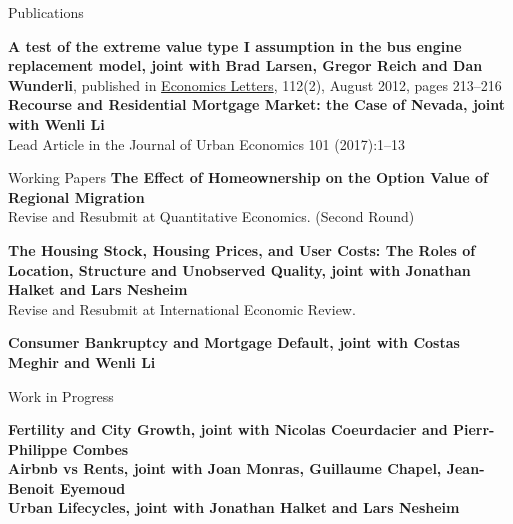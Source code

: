 \documentclass{cvjobmarket} %
\begin{document}
\newpage


\begin{rSection}{Publications}

{\textbf{A test of the extreme value type I assumption in the bus engine replacement model, joint with Brad Larsen, Gregor Reich and Dan Wunderli}, published in \href{http://www.sciencedirect.com/science/article/pii/S0165176512000870}{Economics Letters}, 112(2), August 2012, pages 213--216}\\ 


{\textbf{Recourse and Residential Mortgage Market: the Case of Nevada, joint with Wenli Li}} \\
{Lead Article in the Journal of Urban Economics 101 (2017):1–13}

\end{rSection}

\begin{rSection}{Working Papers}
{\textbf{The Effect of Homeownership on the Option Value of Regional Migration}}\\
{Revise and Resubmit at Quantitative Economics. (Second Round)}

{\textbf{The Housing Stock, Housing Prices, and User Costs: The Roles of Location, Structure and Unobserved Quality, joint with Jonathan Halket and Lars Nesheim}} \\
{Revise and Resubmit at International Economic Review.}

{\textbf{Consumer Bankruptcy and Mortgage Default, joint with Costas Meghir and Wenli Li}} \\



\end{rSection}
\begin{rSection}{Work in Progress}

{\textbf{Fertility and City Growth, joint with Nicolas Coeurdacier and Pierr-Philippe Combes}} \\

{\textbf{Airbnb vs Rents, joint with Joan Monras, Guillaume Chapel, Jean-Benoit Eyemoud}} \\

{\textbf{Urban Lifecycles, joint with Jonathan Halket and Lars Nesheim}} \\

\end{rSection}
\end{document}
